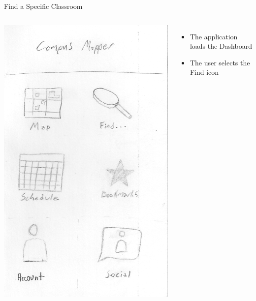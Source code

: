 \documentclass{beamer}
\begin{document}
\begin{frame}{Find a Specific Classroom}
    \begin{columns}[c]
        \center\includegraphics[height=0.75 \textheight]{hand-drawn/dashboard.png}
        \begin{itemize}
            \item The application loads the Dashboard
            \item The user selects the Find icon
        \end{itemize}
    \end{columns}
\end{frame}
\end{document}

